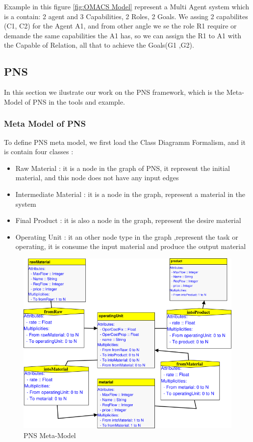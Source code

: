 Example in this figure \ref{fig:OMACS Model} represent a Multi Agent system which is a contain: 2 agent and 3 Capabilities, 2 Roles, 2 Goals.
We assing 2 capabilites (C1, C2) for the Agent A1, and from other angle we se the role R1 require or demande the same capabilities the A1 has, so we can assign the R1 to A1 with the Capable of Relation, all that to achieve the Goals(G1 ,G2). 

\subsection{PNS} 

In this section we ilustrate our work on the PNS framework, which is the Meta-Model of PNS in the tools and example. 
\subsubsection{Meta Model of PNS}
To define PNS meta model, we first load the Class Diagramm Formalism, and it is contain four classes  : 
\begin{itemize}

\newcommand{\localtextbulletone}{\textcolor{gray}{\raisebox{.45ex}{\rule{.6ex}{.6ex}}}}
\renewcommand{\labelitemi}{\localtextbulletone}
	\item Raw Material : it is a node in the graph of PNS, it  represent the initial material, and this node does not have any input edges 
	\item Intermediate Material : it is a node in the graph, represent a material in the system
	\item Final Product : it is also a node in the graph, represent the desire material 
	\item Operating Unit : it an other node type in the graph ,represent the task or operating, it is consume the input material and produce the output material 
\end{itemize}
\pagebreak
\begin{figure}[th] 

	\centering
 	\includegraphics[scale=0.7]{ch3/img/pns_meta}
	\caption{\label{fig:PNS Meta-Model}PNS Meta-Model}
	
\end{figure} 

